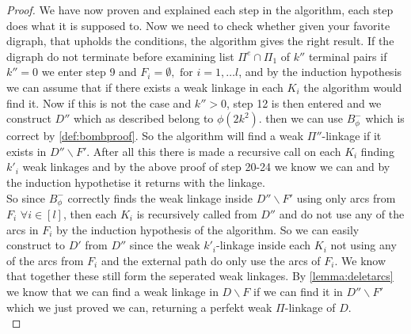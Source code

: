 \begin{proof}
    We have now proven and explained each step in the algorithm, each step does what it is supposed to. 
    Now we need to check whether given your favorite digraph, that upholds the conditions, the algorithm gives the right result.
    If the digraph do not terminate before examining list $\Pi^e\cap \Pi_1$ of $k''$ terminal pairs if $k''=0$ we enter step 9 and $F_i=\emptyset, \text{ for } i=1,\dots l$, and by the induction hypothesis we can assume that if there exists a weak linkage in each $K_i$ the algorithm would find it. 
    Now if this is not the case and $k''>0$, step 12 is then entered and we construct $D''$ which as described belong to $\phi(2k^2)$. then we can use $B_\phi^-$ which is correct by \autoref{def:bombproof}. 
    So the algorithm will find a weak $\Pi''$-linkage if it exists in $D''\backslash F'$. 
    After all this there is made a recursive call on each $K_i$ finding $k'_i$ weak linkages and by the above proof of step 20-24 we know we can and by the induction hypothetise it returns with the linkage.\\ 
    So since $B_\phi^-$ correctly finds the weak linkage inside $D''\backslash F'$ using only arcs from $F_i$ $\forall i\in[l]$, then each $K_i$ is recursively called from $D''$ and do not use any of the arcs in $F_i$ by the induction hypothesis of the algorithm. 
    So we can easily construct to $D'$ from $D''$ since the weak $k'_i$-linkage inside each $K_i$ not using any of the arcs from $F_i$ and the external path do only use the arcs of $F_i$. 
    We know that together these still form the seperated weak linkages.
    By \autoref{lemma:deletarcs} we know that we can find a weak linkage in $D\backslash F$ if we can find it in $D''\backslash F'$ which we just proved we can, 
    returning a perfekt weak $\Pi$-linkage of $D$.\\


\end{proof}
